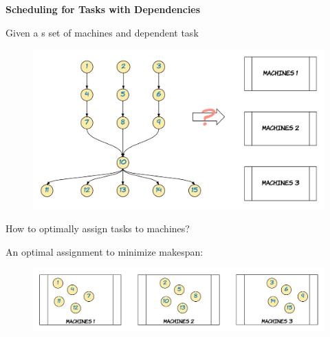 \Large { \bf Scheduling for Tasks with Dependencies}

\Large Given a s set of machines and dependent task
\begin{figure}[h]
	\includegraphics*[width=0.5\linewidth]{images/Fig1.png}
\end{figure}

How to optimally assign tasks to machines?

An optimal assignment to minimize makespan:
\begin{figure}[h]
	\includegraphics*[width=0.5\linewidth]{images/Fig2.png}
\end{figure}
